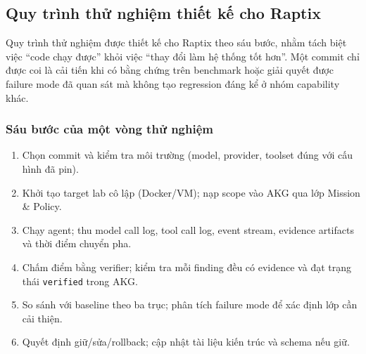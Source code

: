 \subsection{Quy trình thử nghiệm thiết kế cho Raptix}
\label{sec:quy-trinh-thu-nghiem}

Quy trình thử nghiệm được thiết kế cho Raptix theo sáu bước, nhằm tách biệt việc ``code chạy được'' khỏi việc ``thay đổi làm hệ thống tốt hơn''. Một commit chỉ được coi là cải tiến khi có bằng chứng trên benchmark hoặc giải quyết được failure mode đã quan sát mà không tạo regression đáng kể ở nhóm capability khác.

\subsubsection*{Sáu bước của một vòng thử nghiệm}

\begin{enumerate}
    \item Chọn commit và kiểm tra môi trường (model, provider, toolset đúng với cấu hình đã pin).
    \item Khởi tạo target lab cô lập (Docker/VM); nạp scope vào AKG qua lớp Mission \& Policy.
    \item Chạy agent; thu model call log, tool call log, event stream, evidence artifacts và thời điểm chuyển pha.
    \item Chấm điểm bằng verifier; kiểm tra mỗi finding đều có evidence và đạt trạng thái \texttt{verified} trong AKG.
    \item So sánh với baseline theo ba trục; phân tích failure mode để xác định lớp cần cải thiện.
    \item Quyết định giữ/sửa/rollback; cập nhật tài liệu kiến trúc và schema nếu giữ.
\end{enumerate}

